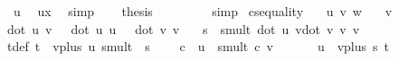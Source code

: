\begin{isabellebody}
\ {}{\isacharcolon}{\kern0pt}\ {\isachardoublequoteopen}{\isachardot}{\kern0pt}{\isachardot}{\kern0pt}{\isachardot}{\kern0pt}\ {\isacharequal}{\kern0pt}\ u{\isachardoublequoteclose}\ \isamarkupfalse%
\ ux\ \isamarkupfalse%
\ simp\isanewline
\ \ \isamarkupfalse%
\ {\isacharquery}{\kern0pt}thesis\ \isamarkupfalse%
\ {}\ {}\ {}\ {}\ {}\ \isamarkupfalse%
\ simp\isanewline
{}\isamarkupfalse%
%
\endisatagproof
{\isafoldproof}%
%
\isadelimproof
\isanewline
%
\endisadelimproof
\isanewline
{}\isamarkupfalse%
\ cs{\isacharunderscore}{\kern0pt}equality{\isacharcolon}{\kern0pt}\isanewline
\ \ \ u\ v\ w\isanewline
\ \ \ {\isachardoublequoteopen}v\ {\isasymnoteq}\ {\isacharparenleft}{\kern0pt}{}{\isacharcomma}{\kern0pt}{}{\isacharcomma}{\kern0pt}{}{\isacharparenright}{\kern0pt}{\isachardoublequoteclose}\isanewline
\ \ \ {\isachardoublequoteopen}{\isacharparenleft}{\kern0pt}dot\ u\ v{\isacharparenright}{\kern0pt}{\isacharcircum}{\kern0pt}{}\ \ {\isacharequal}{\kern0pt}\ {\isacharparenleft}{\kern0pt}dot\ u\ u{\isacharparenright}{\kern0pt}\ {\isacharasterisk}{\kern0pt}\ \ {\isacharparenleft}{\kern0pt}dot\ v\ v{\isacharparenright}{\kern0pt}{\isachardoublequoteclose}\isanewline
\ \ \ {\isachardoublequoteopen}s\ {\isasymequiv}\ smult\ {\isacharparenleft}{\kern0pt}{\isacharparenleft}{\kern0pt}dot\ u\ v{\isacharparenright}{\kern0pt}{\isacharslash}{\kern0pt}{\isacharparenleft}{\kern0pt}dot\ v\ v{\isacharparenright}{\kern0pt}{\isacharparenright}{\kern0pt}\ v{\isachardoublequoteclose}\isanewline
\ \ \ tdef{\isacharcolon}{\kern0pt}\ {\isachardoublequoteopen}t\ {\isasymequiv}\ vplus\ u\ {\isacharparenleft}{\kern0pt}smult\ {\isacharparenleft}{\kern0pt}{\isacharminus}{\kern0pt}{}{\isacharparenright}{\kern0pt}\ s{\isacharparenright}{\kern0pt}{\isachardoublequoteclose}\isanewline
\ \ \ {\isachardoublequoteopen}{\isasymexists}\ c\ {\isachardot}{\kern0pt}\ u\ {\isacharequal}{\kern0pt}\ smult\ c\ v{\isachardoublequoteclose}\isanewline
%
\isadelimproof
%
\endisadelimproof
%
\isatagproof
{}\isamarkupfalse%
\ {\isacharminus}{\kern0pt}\isanewline
\ \ \isamarkupfalse%
\ {}{\isacharcolon}{\kern0pt}\ {\isachardoublequoteopen}u\ {\isacharequal}{\kern0pt}\ vplus\ s\ t{\isachardoublequoteclose}\ \isamarkupfalse%

\end{isabellebody}
